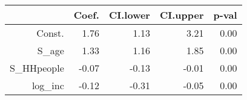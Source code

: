 \begin{table}[ht]
\centering
\begin{tabular}{rrrrr}
  \hline
 & Coef. & CI.lower & CI.upper & p-val \\ 
  \hline
Const. & 1.76 & 1.13 & 3.21 & 0.00 \\ 
  S\_age & 1.33 & 1.16 & 1.85 & 0.00 \\ 
  S\_HHpeople & -0.07 & -0.13 & -0.01 & 0.00 \\ 
  log\_inc & -0.12 & -0.31 & -0.05 & 0.00 \\ 
   \hline
\end{tabular}
\end{table}
